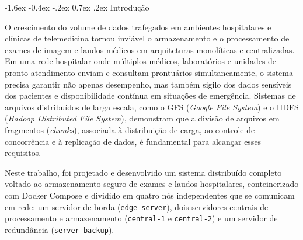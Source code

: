 \documentclass[12pt]{article}
\makeatletter
\renewcommand\section{\@startsection {section}{1}{\z@}%
    {-1.6ex \@plus -0.4ex \@minus -.2ex}%
    {0.7ex \@plus.2ex}%
    {\normalfont\large\bfseries}}
\makeatother
\begin{document}
\section{Introdução}

O crescimento do volume de dados trafegados em ambientes hospitalares e clínicas de telemedicina tornou inviável o armazenamento e o processamento de exames de imagem e laudos médicos em arquiteturas monolíticas e centralizadas. Em uma rede hospitalar onde múltiplos médicos, laboratórios e unidades de pronto atendimento enviam e consultam prontuários simultaneamente, o sistema precisa garantir não apenas desempenho, mas também sigilo dos dados sensíveis dos pacientes e disponibilidade contínua em situações de emergência. Sistemas de arquivos distribuídos de larga escala, como o GFS (\textit{Google File System}) e o HDFS (\textit{Hadoop Distributed File System}), demonstram que a divisão de arquivos em fragmentos (\textit{chunks}), associada à distribuição de carga, ao controle de concorrência e à replicação de dados, é fundamental para alcançar esses requisitos.

Neste trabalho, foi projetado e desenvolvido um sistema distribuído completo voltado ao armazenamento seguro de exames e laudos hospitalares, conteinerizado com Docker Compose e dividido em quatro nós independentes que se comunicam em rede: um servidor de borda (\texttt{edge-server}), dois servidores centrais de processamento e armazenamento (\texttt{central-1} e \texttt{central-2}) e um servidor de redundância (\texttt{server-backup}).
\end{document}
